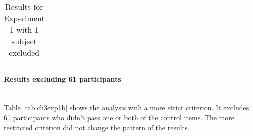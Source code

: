\documentclass[
  11pt          %
  ,letterpaper  %
  ,center       %
  ,noupper      %
  ]{uconnthesis2}
\begin{document}
\begin{table}[h]
{\begin{tabular}{ | c | c | c | c | c | c | c |}
\end{tabular}}
\caption{Results for Experiment 1 with 1 subject excluded}
\label{tab:ch3exp1a}
\end{table} 


\paragraph{Results excluding 61 participants}~\\

Table \ref{tab:ch3exp1b} shows the analysis with a more strict criterion. It excludes 61 participants who didn't pass one or both of the control items. The more restricted criterion did not change the pattern of the results.
\end{document}
